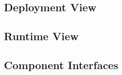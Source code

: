 \documentclass{article}
\begin{document}
\subsection{Deployment View}
\begin{figure}[H]
\end{figure}
\subsection{Runtime View}
\subsection{Component Interfaces}
\end{document}
